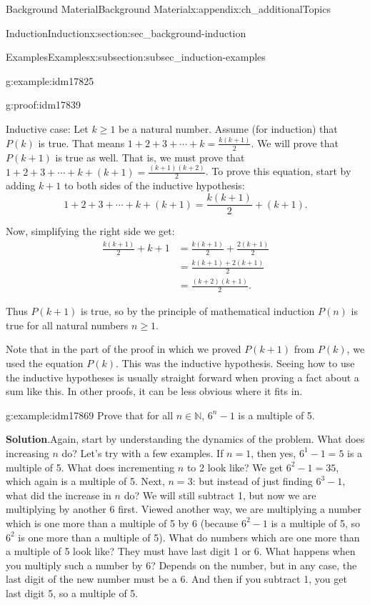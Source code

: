 \documentclass[oneside,10pt,]{book}
\numberwithin{equation}{chapter}
\def\N{\mathbb N}
\newcommand{\amp}{&}
\begin{document}
\begin{appendixptx}{Background Material}{}{Background Material}{}{}{x:appendix:ch_additionalTopics}
\begin{sectionptx}{Induction}{}{Induction}{}{}{x:section:sec_background-induction}
\begin{subsectionptx}{Examples}{}{Examples}{}{}{x:subsection:subsec_induction-examples}
\begin{example}{}{g:example:idm17825}
\begin{proofptx}{}{g:proof:idm17839}
\par
Inductive case: Let \(k \ge 1\) be a natural number. Assume (for induction) that \(P(k)\) is true. That means \(1 + 2 + 3 + \cdots + k = \frac{k(k+1)}{2}\). We will prove that \(P(k+1)\) is true as well. That is, we must prove that \(1 + 2 + 3 + \cdots + k + (k+1) = \frac{(k+1)(k+2)}{2}\). To prove this equation, start by adding \(k+1\) to both sides of the inductive hypothesis:%
\begin{equation*}
1 + 2 + 3 + \cdots + k + (k+1) = \frac{k(k+1)}{2} + (k+1).
\end{equation*}
%
\par
Now, simplifying the right side we get:%
\begin{align*}
\frac{k(k+1)}{2} + k+1 \amp = \frac{k(k+1)}{2} + \frac{2(k+1)}{2}\\
\amp = \frac{k(k+1) + 2(k+1)}{2}\\
\amp = \frac{(k+2)(k+1)}{2}.
\end{align*}
%
\par
Thus \(P(k+1)\) is true, so by the principle of mathematical induction \(P(n)\) is true for all natural numbers \(n \ge 1\).%
\end{proofptx}
\end{example}
Note that in the part of the proof in which we proved \(P(k+1)\) from \(P(k)\), we used the equation \(P(k)\). This was the inductive hypothesis. Seeing how to use the inductive hypotheses is usually straight forward when proving a fact about a sum like this. In other proofs, it can be less obvious where it fits in.%
\begin{example}{}{g:example:idm17869}%
Prove that for all \(n \in \N\), \(6^n - 1\) is a multiple of 5.%
\par\smallskip%
\noindent\textbf{Solution}.\hypertarget{g:solution:idm17874}{}\quad{}Again, start by understanding the dynamics of the problem. What does increasing \(n\) do? Let's try with a few examples. If \(n = 1\), then yes, \(6^1 - 1 = 5\) is a multiple of 5. What does incrementing \(n\) to 2 look like? We get \(6^2 - 1 = 35\), which again is a multiple of 5. Next, \(n = 3\): but instead of just finding \(6^3 - 1\), what did the increase in \(n\) do? We will still subtract 1, but now we are multiplying by another 6 first. Viewed another way, we are multiplying a number which is one more than a multiple of 5 by 6 (because \(6^2 - 1\) is a multiple of 5, so \(6^2\) is one more than a multiple of 5). What do numbers which are one more than a multiple of 5 look like? They must have last digit 1 or 6. What happens when you multiply such a number by 6? Depends on the number, but in any case, the last digit of the new number must be a 6. And then if you subtract 1, you get last digit 5, so a multiple of 5.%

\end{example}
\end{subsectionptx}
\end{sectionptx}
\end{appendixptx}
\end{document}
